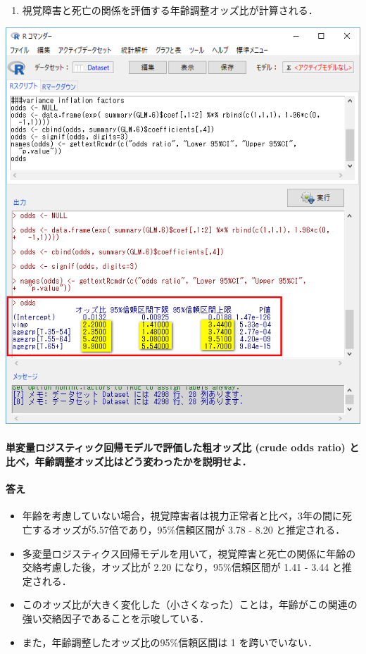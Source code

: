 \documentclass[11pt,]{problemset}
\providecommand{\tightlist}{%
  \setlength{\itemsep}{0pt}\setlength{\parskip}{0pt}}
\let\oldparagraph\paragraph
\renewcommand{\paragraph}[1]{\oldparagraph{#1}\mbox{}}
\begin{document}
\begin{enumerate}
\def\labelenumi{\arabic{enumi}.}
\setcounter{enumi}{3}
\tightlist
\item
  視覚障害と死亡の関係を評価する年齢調整オッズ比が計算される．
\end{enumerate}

\begin{center}\includegraphics[width=0.5\linewidth,height=0.5\textheight]{pic/mltlogstic07} \end{center}

\hypertarget{-crude-odds-ratio-}{%
\paragraph{単変量ロジスティック回帰モデルで評価した粗オッズ比 (crude
odds ratio)
と比べ，年齢調整オッズ比はどう変わったかを説明せよ．}\label{-crude-odds-ratio-}}

\hypertarget{-7}{%
\paragraph{答え}\label{-7}}

\begin{itemize}
\item
  年齢を考慮していない場合，視覚障害者は視力正常者と比べ，3年の間に死亡するオッズが5.57倍であり，95\%信頼区間が
  3.78 - 8.20 と推定される．
\item
  多変量ロジスティクス回帰モデルを用いて，視覚障害と死亡の関係に年齢の交絡考慮した後，オッズ比が
  2.20 になり，95\%信頼区間が 1.41 - 3.44 と推定される．
\item
  このオッズ比が大きく変化した（小さくなった）ことは，年齢がこの関連の強い交絡因子であることを示唆している．
\item
  また，年齢調整したオッズ比の95\%信頼区間は 1 を跨いでいない．
\end{itemize}
\end{document}
